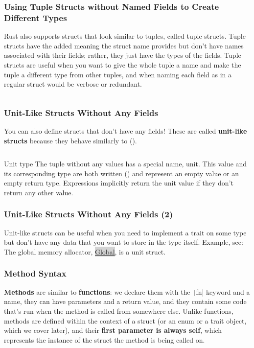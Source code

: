 \documentclass{beamer}
\begin{document}
\begin{frame}[fragile]
	\frametitle{Using Tuple Structs without Named Fields to Create Different Types}
	Rust also supports structs that look similar to tuples, called tuple structs. Tuple structs have the added meaning the struct name provides but don’t have names associated with their fields; rather, they just have the types of the fields. Tuple structs are useful when you want to give the whole tuple a name and make the tuple a different type from other tuples, and when naming each field as in a regular struct would be verbose or redundant.
	\inputminted{rust}{./code/tuple-struct.rs}
\end{frame}


\begin{frame}[fragile]
	\frametitle{Unit-Like Structs Without Any Fields}
	You can also define structs that don’t have any fields! These are called \textbf{unit-like structs} because they behave similarly to ().
	\inputminted{rust}{./code/unit-like-struct.rs}
	
	\begin{block}{Unit type}
		The tuple without any values has a special name, unit. This value and its corresponding type are both written () and represent an empty value or an empty return type. Expressions implicitly return the unit value if they don’t return any other value.
	\end{block}
\end{frame}

\begin{frame}[fragile]
	\frametitle{Unit-Like Structs Without Any Fields (2)}
	Unit-like structs can be useful when you need to implement a trait on some type but don’t have any data that you want to store in the type itself. 
	Example, see: The global memory allocator, \href{https://doc.rust-lang.org/src/alloc/alloc.rs.html#59}{\colorbox{lightgray}{Global}}, is a unit struct.
\end{frame}

\begin{frame}[fragile]
	\frametitle{Method Syntax}
	\textbf{Methods} are similar to \textbf{functions}: we declare them with the \texttt|fn| keyword and a name, they can have parameters and a return value, and they contain some code that’s run when the method is called from somewhere else. Unlike functions, methods are defined within the context of a struct (or an enum or a trait object, which we cover later), and their \textbf{first parameter is always self}, which represents the instance of the struct the method is being called on.
\end{frame}
\end{document}
